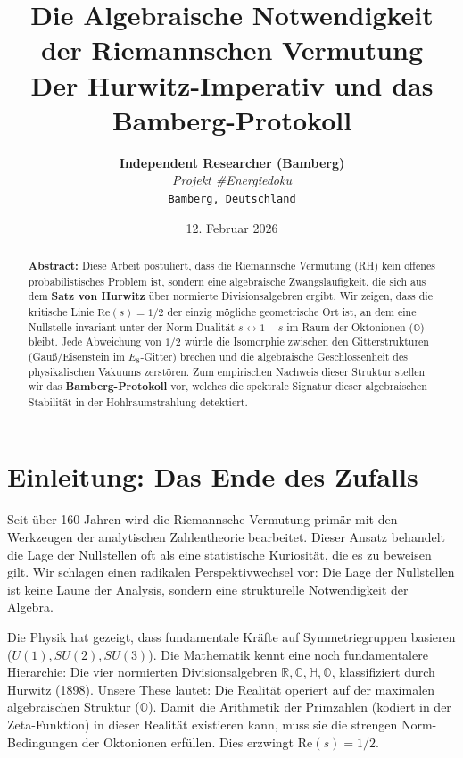 \documentclass[11pt, a4paper]{article}
\title{\textbf{Die Algebraische Notwendigkeit der Riemannschen Vermutung}\\ \large Der Hurwitz-Imperativ und das Bamberg-Protokoll}
\author{
	\textbf{Independent Researcher (Bamberg)} \\
	\textit{Projekt \#Energiedoku} \\
	\texttt{Bamberg, Deutschland}
}
\date{12. Februar 2026}
\begin{document}
	
	\maketitle
	
	\begin{abstract}
		\noindent
		\textbf{Abstract:} Diese Arbeit postuliert, dass die Riemannsche Vermutung (RH) kein offenes probabilistisches Problem ist, sondern eine algebraische Zwangsläufigkeit, die sich aus dem \textbf{Satz von Hurwitz} über normierte Divisionsalgebren ergibt. Wir zeigen, dass die kritische Linie $\text{Re}(s)=1/2$ der einzig mögliche geometrische Ort ist, an dem eine Nullstelle invariant unter der Norm-Dualität $s \leftrightarrow 1-s$ im Raum der Oktonionen ($\mathbb{O}$) bleibt. Jede Abweichung von $1/2$ würde die Isomorphie zwischen den Gitterstrukturen (Gauß/Eisenstein im $E_8$-Gitter) brechen und die algebraische Geschlossenheit des physikalischen Vakuums zerstören. Zum empirischen Nachweis dieser Struktur stellen wir das \textbf{Bamberg-Protokoll} vor, welches die spektrale Signatur dieser algebraischen Stabilität in der Hohlraumstrahlung detektiert.
	\end{abstract}
	
	\section{Einleitung: Das Ende des Zufalls}
	
	Seit über 160 Jahren wird die Riemannsche Vermutung primär mit den Werkzeugen der analytischen Zahlentheorie bearbeitet. Dieser Ansatz behandelt die Lage der Nullstellen oft als eine statistische Kuriosität, die es zu beweisen gilt.
	Wir schlagen einen radikalen Perspektivwechsel vor: Die Lage der Nullstellen ist keine Laune der Analysis, sondern eine strukturelle Notwendigkeit der Algebra.
	
	Die Physik hat gezeigt, dass fundamentale Kräfte auf Symmetriegruppen basieren ($U(1), SU(2), SU(3)$). Die Mathematik kennt eine noch fundamentalere Hierarchie: Die vier normierten Divisionsalgebren $\mathbb{R}, \mathbb{C}, \mathbb{H}, \mathbb{O}$, klassifiziert durch Hurwitz (1898).
	Unsere These lautet: Die Realität operiert auf der maximalen algebraischen Struktur ($\mathbb{O}$). Damit die Arithmetik der Primzahlen (kodiert in der Zeta-Funktion) in dieser Realität existieren kann, muss sie die strengen Norm-Bedingungen der Oktonionen erfüllen. Dies erzwingt $\text{Re}(s)=1/2$.
	
\end{document}

